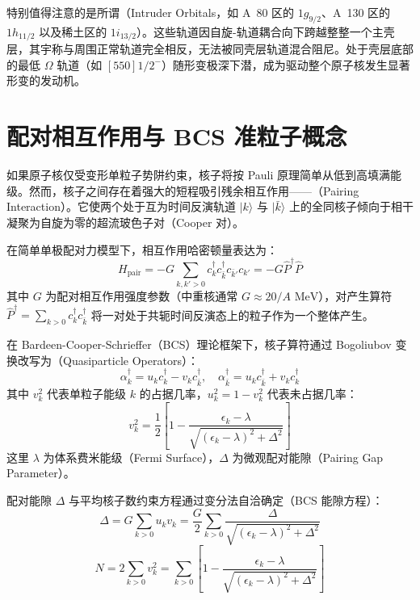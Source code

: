 特别值得注意的是所谓（Intruder Orbitals，如 A~80 区的 $1g_{9/2}$、A~130 区的 $1h_{11/2}$ 以及稀土区的 $1i_{13/2}$）。这些轨道因自旋-轨道耦合向下跨越整整一个主壳层，其宇称与周围正常轨道完全相反，无法被同壳层轨道混合阻尼。处于壳层底部的最低 $\Omega$ 轨道（如 $[550]1/2^-$）随形变极深下潜，成为驱动整个原子核发生显著形变的发动机。

\section{配对相互作用与 BCS 准粒子概念}
\label{sec:bcs_pairing}

如果原子核仅受变形单粒子势阱约束，核子将按 Pauli 原理简单从低到高填满能级。然而，核子之间存在着强大的短程吸引残余相互作用——（Pairing Interaction）。它使两个处于互为时间反演轨道 $|k\rangle$ 与 $|\bar{k}\rangle$ 上的全同核子倾向于相干凝聚为自旋为零的超流玻色子对（Cooper 对）。

在简单单极配对力模型下，相互作用哈密顿量表达为：
\begin{equation}
    H_{\text{pair}} = -G \sum_{k, k'>0} c_k^\dagger c_{\bar{k}}^\dagger c_{\bar{k}'} c_{k'} = -G \hat{P}^\dagger \hat{P}
    \label{eq:monopole_pairing}
\end{equation}
其中 $G$ 为配对相互作用强度参数（中重核通常 $G \approx 20/A\text{ MeV}$），对产生算符 $\hat{P}^\dagger = \sum_{k>0} c_k^\dagger c_{\bar{k}}^\dagger$ 将一对处于共轭时间反演态上的粒子作为一个整体产生。

在 Bardeen-Cooper-Schrieffer（BCS）理论框架下，核子算符通过 Bogoliubov 变换改写为（Quasiparticle Operators）：
\begin{equation}
    \alpha^\dagger_k = u_k c^\dagger_k - v_k c^\dagger_{\bar{k}}, \quad \alpha^\dagger_{\bar{k}} = u_k c^\dagger_{\bar{k}} + v_k c^\dagger_k
    \label{eq:bogoliubov_trans}
\end{equation}
其中 $v_k^2$ 代表单粒子能级 $k$ 的占据几率，$u_k^2 = 1 - v_k^2$ 代表未占据几率：
\begin{equation}
    v_k^2 = \frac{1}{2} \left[ 1 - \frac{\epsilon_k - \lambda}{\sqrt{(\epsilon_k - \lambda)^2 + \Delta^2}} \right]
\end{equation}
这里 $\lambda$ 为体系费米能级（Fermi Surface），$\Delta$ 为微观配对能隙（Pairing Gap Parameter）。

配对能隙 $\Delta$ 与平均核子数约束方程通过变分法自洽确定（BCS 能隙方程）：
\begin{equation}
    \Delta = G \sum_{k>0} u_k v_k = \frac{G}{2} \sum_{k>0} \frac{\Delta}{\sqrt{(\epsilon_k - \lambda)^2 + \Delta^2}}
    \label{eq:gap_equation}
\end{equation}
\begin{equation}
    N = 2 \sum_{k>0} v_k^2 = \sum_{k>0} \left[ 1 - \frac{\epsilon_k - \lambda}{\sqrt{(\epsilon_k - \lambda)^2 + \Delta^2}} \right]
    \label{eq:number_equation}
\end{equation}


